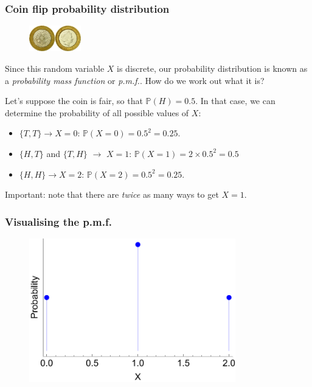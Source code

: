 \documentclass{beamer}
\begin{document}
	\begin{frame}
		\frametitle{Coin flip probability distribution}
		
		\begin{figure}[ht]
			\includegraphics[width=0.2\textwidth]{./figures/coins.jpeg}
		\end{figure}
		
		Since this random variable $X$ is discrete, our probability distribution is known as a \textit{probability mass function} or \textit{p.m.f.}. How do we work out what it is?
		
		\vspace{0.5cm}
		
		Let's suppose the coin is fair, so that $\mathbb{P}(H) = 0.5$. In that case, we can determine the probability of all possible values of $X$:
		
		\begin{itemize}
			\item $\{T,T\}\rightarrow X=0$: $\mathbb{P}(X=0) = 0.5^2 = 0.25$.
			\item $\{H,T\}$ and $\{T,H\}$ $\rightarrow$ $X=1$: $\mathbb{P}(X = 1) = 2 \times 0.5^2 = 0.5$
			\item $\{H,H\} \rightarrow X=2$: $\mathbb{P}(X=2) = 0.5^2 = 0.25$.
		\end{itemize}
		
		Important: note that there are \textit{twice} as many ways to get $X=1$.
		
	\end{frame}
	
	\begin{frame}
		\frametitle{Visualising the p.m.f.}
		
		\begin{figure}[ht]
			\includegraphics[width=0.8\textwidth]{./figures/binomial.pdf}
		\end{figure}
		
	\end{frame}
	
\end{document}
